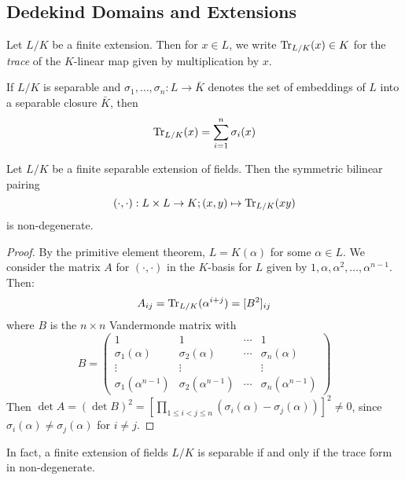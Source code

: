 \documentclass[10pt,a4paper]{article}
\begin{document}
\subsection{Dedekind Domains and Extensions}
Let $L/K$ be a finite extension. Then for $x \in L$, we write $\operatorname{Tr}_{L/K}(x) \in K$ for the \emph{trace} of the $K$-linear map given by multiplication by $x$.

If $L/K$ is separable and $\sigma_1, \ldots, \sigma_n : L \to \bar{K}$ denotes the set of embeddings of $L$ into a separable closure $\bar{K}$, then
\[ \operatorname{Tr}_{L/K}(x) = \sum_{i=1}^n \sigma_i(x)\]
\begin{lemma}
  Let $L/K$ be a finite separable extension of fields. Then the symmetric bilinear pairing
  \[(\cdot,\cdot):L\times L \to K; (x, y)\mapsto \operatorname{Tr}_{L/K}(xy)\]
  is non-degenerate.
\end{lemma}
\begin{proof}
  By the primitive element theorem, $L = K(\alpha)$ for some $\alpha \in L$. We consider the matrix $A$ for $(\cdot,\cdot)$ in the $K$-basis for $L$ given by $1, \alpha, \alpha^2, \ldots, \alpha^{n-1}$. Then:
  \[A_{ij} =\operatorname{Tr}_{L/K}(\alpha^{i+j}) = [B^2]_{ij}\]
  where $B$ is the $n\times n$ Vandermonde matrix with
  \[B = \begin{pmatrix}1 & 1 & \cdots & 1\\\sigma_1(\alpha) & \sigma_2(\alpha) & \cdots & \sigma_n(\alpha) \\ \vdots & \vdots & & \vdots \\ \sigma_1(\alpha^{n-1}) & \sigma_2(\alpha^{n-1}) & \cdots & \sigma_n(\alpha^{n-1})\end{pmatrix}\]
  Then $\det A = (\det B)^2 = \left[\prod\limits_{1\leq i < j \leq n} (\sigma_i(\alpha)-\sigma_j(\alpha))\right]^2 \neq 0$, since $\sigma_i(\alpha)\neq \sigma_j(\alpha)$ for $i \neq j$.
\end{proof}
In fact, a finite extension of fields $L/K$ is separable if and only if the trace form in non-degenerate.
\end{document}
